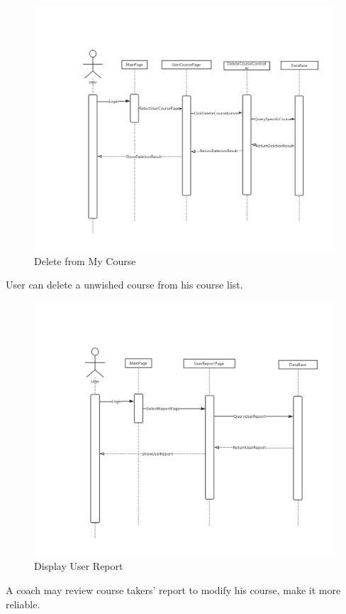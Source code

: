 \documentclass[16pt]{scrreprt}
\begin{document}
\begin{figure}[H]
    \includegraphics[width=\linewidth]{./FuncPhoto/11.png}   
    \caption{Delete from My Course}
\end{figure}
User can delete a unwished course from his course list.

\begin{figure}[H]
    \includegraphics[width=\linewidth]{./FuncPhoto/12.png}   
    \caption{Display User Report}
\end{figure}
A coach may review course takers' report to modify his course, make it more reliable.
\end{document}
